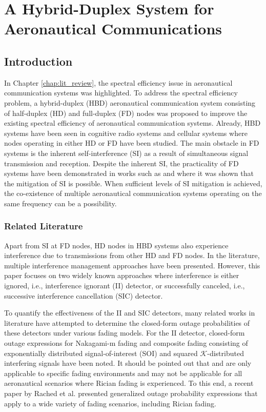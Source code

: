\chapter{A Hybrid-Duplex System for Aeronautical Communications}
\label{chap:HBD_ACS}
\section{Introduction}
In Chapter \ref{chap:lit_review}, the spectral efficiency issue in aeronautical communication systems was highlighted. To address the spectral efficiency problem, a hybrid-duplex (HBD) aeronautical communication system consisting of half-duplex (HD) and full-duplex (FD) nodes was proposed to improve the existing spectral efficiency of aeronautical communication systems. Already, HBD systems have been seen in cognitive radio systems \cite{li2014linear} and cellular systems \cite{yin2013full,jang2015spatial,cirik2016robust} where nodes operating in either HD or FD have been studied. The main obstacle in FD systems is the inherent self-interference (SI) as a result of simultaneous signal transmission and reception. Despite the inherent SI, the practicality of FD systems have been demonstrated in works such as \cite{bharadia2013full} and \cite{sahai2013impact} where it was shown that the mitigation of SI is possible. When sufficient levels of SI mitigation is achieved, the co-existence of multiple aeronautical communication systems operating on the same frequency can be a possibility. 

\subsection{Related Literature}
Apart from SI at FD nodes, HD nodes in HBD systems also experience interference due to transmissions from other HD and FD nodes. In the literature, multiple interference management approaches have been presented. However, this paper focuses on two widely known approaches where interference is either ignored, i.e., interference ignorant (II) detector, or successfully canceled, i.e., successive interference cancellation (SIC) detector. 

To quantify the effectiveness of the II and SIC detectors, many related works in literature have attempted to determine the closed-form outage probabilities of these detectors under various fading models. For the II detector, closed-form outage expressions for Nakagami-m fading \cite{yao1992investigations} and composite fading consisting of exponentially distributed signal-of-interest (SOI) and squared ${\mathcal{K}}$-distributed interfering signals \cite{bithas2015mobile} have been noted. It should be pointed out that \cite{yao1992investigations} and \cite{bithas2015mobile} are only applicable to specific fading environments and may not be applicable for all aeronautical scenarios where Rician fading is experienced. To this end, a recent paper by Rached et al. \cite{rached2017unified} presented generalized outage probability expressions that apply to a wide variety of fading scenarios, including Rician fading.

